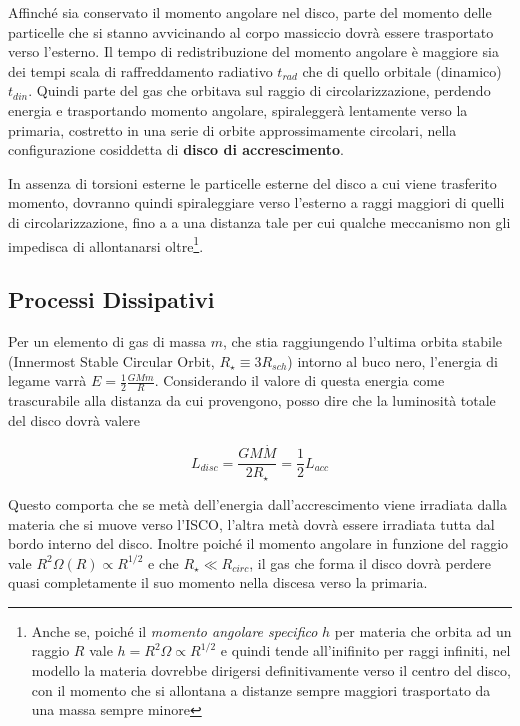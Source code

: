 \documentclass[a4paperbi]{article}
\begin{document}
	Affinché sia conservato il momento angolare nel disco, parte del momento delle particelle che si stanno avvicinando al corpo massiccio dovrà essere trasportato verso l'esterno. Il tempo di redistribuzione del momento angolare è maggiore sia dei tempi scala di raffreddamento radiativo $t_{rad}$ che di quello orbitale (dinamico) $t_{din}$. Quindi parte del gas che orbitava sul raggio di circolarizzazione, perdendo energia e trasportando momento angolare, spiraleggerà lentamente verso la primaria, costretto in una serie di orbite approssimamente circolari, nella configurazione cosiddetta di \textbf{disco di accrescimento}. 	
	
	In assenza di torsioni esterne le particelle esterne del disco a cui viene trasferito momento, dovranno quindi spiraleggiare verso l'esterno a raggi maggiori di quelli di circolarizzazione, fino a a una distanza tale per cui qualche meccanismo non gli impedisca di allontanarsi oltre\footnote{Anche se, poiché il \textit{momento angolare specifico} $h$ per materia che orbita ad un raggio $R$ vale $h=R^2\Omega\propto R^{1/2}$ e quindi tende all'inifinito per raggi infiniti, nel modello la materia dovrebbe dirigersi definitivamente verso il centro del disco, con il momento che si allontana a distanze sempre maggiori trasportato da una massa sempre minore}.
		
\subsection{Processi Dissipativi}
	Per un elemento di gas di massa $m$, che stia raggiungendo l'ultima orbita stabile (Innermost Stable Circular Orbit,  $R_{\star}\equiv 3R_{sch}$) intorno al buco nero, l'energia di legame varrà $E=\frac{1}{2}\frac{GMm}{R}$. Considerando il valore di questa energia come trascurabile alla distanza da cui provengono, posso dire che la luminosità totale del disco dovrà valere
	
	\begin{equation}
		L_{disc}=\frac{GM\dot{M}}{2R_{\star}}=\frac{1}{2}L_{acc}
	\end{equation}

	Questo comporta che se metà dell'energia dall'accrescimento viene irradiata dalla materia che si muove verso l'ISCO, l'altra metà dovrà essere irradiata tutta dal bordo interno del disco. Inoltre poiché il momento angolare in funzione del raggio vale $R^2\Omega(R)\propto R^{1/2}$ e che $R_{\star}\ll R_{circ}$, il gas che forma il disco dovrà perdere quasi completamente il suo momento nella discesa verso la primaria.
	
\end{document}

